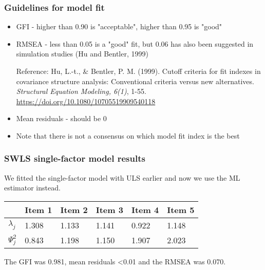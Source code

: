 \documentclass[compress]{beamer}
\begin{document}
\begin{frame}[fragile]
\frametitle{Guidelines for model fit}
\begin{itemize}
\item GFI - higher than 0.90 is "acceptable", higher than 0.95 is "good"
\item RMSEA - less than 0.05 is a "good" fit, but 0.06 has also been suggested in simulation studies (Hu and Bentler, 1999)\\
\begin{tiny}
Reference: Hu, L.-t., \& Bentler, P. M. (1999). Cutoff criteria for fit indexes in covariance structure analysis: Conventional criteria versus new alternatives. \textit{Structural Equation Modeling, 6(1)}, 1-55. \url{https://doi.org/10.1080/10705519909540118}
\end{tiny}
\item Mean residuals - should be 0
\item Note that there is not a consensus on which model fit index is the best 
\end{itemize}

\end{frame}

\begin{frame}[fragile]
\frametitle{SWLS single-factor model results}
We fitted the single-factor model with ULS earlier and now we use the ML estimator instead.\newline
\begin{tabular}{l|lllll}
\hline
& Item 1 & Item 2 & Item 3 & Item 4 & Item 5\\
\hline
$\lambda_j$ & 1.308 & 1.133 & 1.141 & 0.922 & 1.148\\
$\Psi_j^2$ & 0.843 & 1.198 & 1.150 & 1.907 & 2.023\\
\hline
\end{tabular}\newline
The GFI was 0.981, mean residuals <0.01 and the RMSEA was 0.070.
\end{frame}
\end{document}
